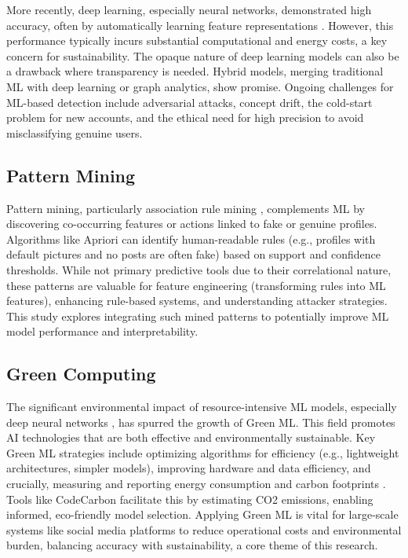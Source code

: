 \documentclass[conference]{IEEEtran}
\begin{document}
More recently, deep learning, especially neural networks, demonstrated high accuracy, often by automatically learning feature representations \cite{b6}. However, this performance typically incurs substantial computational and energy costs, a key concern for sustainability. The opaque nature of deep learning models can also be a drawback where transparency is needed. Hybrid models, merging traditional ML with deep learning or graph analytics, show promise. Ongoing challenges for ML-based detection include adversarial attacks, concept drift, the cold-start problem for new accounts, and the ethical need for high precision to avoid misclassifying genuine users.

\subsection{Pattern Mining}
Pattern mining, particularly association rule mining \cite{b10}, complements ML by discovering co-occurring features or actions linked to fake or genuine profiles. Algorithms like Apriori can identify human-readable rules (e.g., profiles with default pictures and no posts are often fake) based on support and confidence thresholds. While not primary predictive tools due to their correlational nature, these patterns are valuable for feature engineering (transforming rules into ML features), enhancing rule-based systems, and understanding attacker strategies. This study explores integrating such mined patterns to potentially improve ML model performance and interpretability.

\subsection{Green Computing}
The significant environmental impact of resource-intensive ML models, especially deep neural networks \cite{b4}, has spurred the growth of Green ML. This field promotes AI technologies that are both effective and environmentally sustainable. Key Green ML strategies include optimizing algorithms for efficiency (e.g., lightweight architectures, simpler models), improving hardware and data efficiency, and crucially, measuring and reporting energy consumption and carbon footprints \cite{b11}. Tools like CodeCarbon \cite{b13} facilitate this by estimating CO2 emissions, enabling informed, eco-friendly model selection. Applying Green ML is vital for large-scale systems like social media platforms to reduce operational costs and environmental burden, balancing accuracy with sustainability, a core theme of this research.
\end{document}
